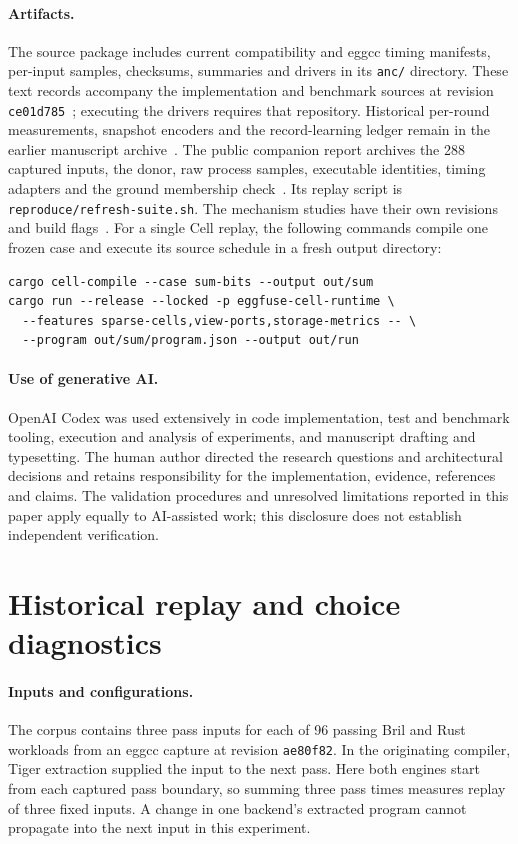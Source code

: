 \documentclass[10pt,letterpaper]{article}
\newcommand{\code}[1]{\texttt{#1}}
\begin{document}
\paragraph{Artifacts.}
The source package includes current compatibility and eggcc timing manifests, per-input samples, checksums, summaries and drivers in its \texttt{anc/} directory. These text records accompany the implementation and benchmark sources at revision \texttt{ce01d785}~\cite{currentartifact}; executing the drivers requires that repository. Historical per-round measurements, snapshot encoders and the record-learning ledger remain in the earlier manuscript archive~\cite{manuscriptartifact}. The public companion report archives the 288 captured inputs, the donor, raw process samples, executable identities, timing adapters and the ground membership check~\cite{artifact}. Its replay script is \texttt{reproduce/refresh-suite.sh}. The mechanism studies have their own revisions and build flags~\cite{bakeartifact,cellsource,receipts}. For a single Cell replay, the following commands compile one frozen case and execute its source schedule in a fresh output directory:
\begin{verbatim}
cargo cell-compile --case sum-bits --output out/sum
cargo run --release --locked -p eggfuse-cell-runtime \
  --features sparse-cells,view-ports,storage-metrics -- \
  --program out/sum/program.json --output out/run
\end{verbatim}

\paragraph{Use of generative AI.}
OpenAI Codex was used extensively in code implementation, test and benchmark tooling, execution and analysis of experiments, and manuscript drafting and typesetting. The human author directed the research questions and architectural decisions and retains responsibility for the implementation, evidence, references and claims. The validation procedures and unresolved limitations reported in this paper apply equally to AI-assisted work; this disclosure does not establish independent verification.

\appendix
\section{Historical replay and choice diagnostics}
\paragraph{Inputs and configurations.}
The corpus contains three pass inputs for each of 96 passing Bril and Rust workloads from an eggcc capture at revision \code{ae80f82}. In the originating compiler, Tiger extraction supplied the input to the next pass. Here both engines start from each captured pass boundary, so summing three pass times measures replay of three fixed inputs. A change in one backend's extracted program cannot propagate into the next input in this experiment.
\end{document}
